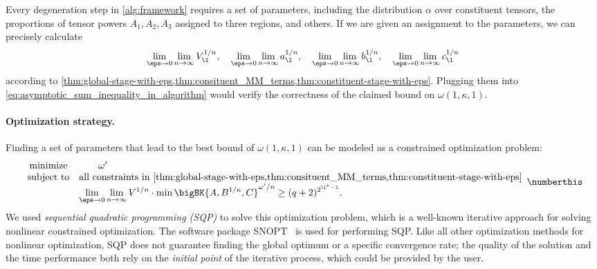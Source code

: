 \bigskip

Every degeneration step in \cref{alg:framework} requires a set of parameters, including the distribution $\alpha$ over constituent tensors, the proportions of tensor powers $A_1, A_2, A_3$ assigned to three regions, and others. If we are given an assignment to the parameters, we can precisely calculate
\[
  \lim_{\eps \to 0} \lim_{n \to \infty} \numgrowl^{1/n}, \quad \lim_{\eps \to 0} \lim_{n \to \infty} a_\l^{1/n}, \quad \lim_{\eps \to 0} \lim_{n \to \infty} b_\l^{1/n}, \quad \lim_{\eps \to 0} \lim_{n \to \infty} c_\l^{1/n}
\]
according to \cref{thm:global-stage-with-eps,thm:consituent_MM_terms,thm:constituent-stage-with-eps}. Plugging them into \eqref{eq:asymptotic_sum_inequality_in_algorithm} would verify the correctness of the claimed bound on $\omega(1, \kappa, 1)$.

\paragraph{Optimization strategy.}

Finding a set of parameters that lead to the best bound of $\omega(1, \kappa, 1)$ can be modeled as a constrained optimization problem:
\[
  \begin{array}{cl}
    \textup{minimize} & \qquad \omega' \\
    \textup{subject to} & \textup{all constraints in \cref{thm:global-stage-with-eps,thm:consituent_MM_terms,thm:constituent-stage-with-eps}} \\
                      & \displaystyle \lim_{\eps \to 0} \lim_{n \to \infty} \numgrow^{1/n} \cdot \min\bigBK{A, B^{1/\kappa}, C}^{\omega'/n} \ge (q + 2)^{2^{\l^* - 1}}.
  \end{array}
  \numberthis \label{eq:optimization_problem}
\]
We used \emph{sequential quadratic programming (SQP)} to solve this optimization problem, which is a well-known iterative approach for solving nonlinear constrained optimization. The software package SNOPT~\cite{SNOPT} is used for performing SQP. Like all other optimization methods for nonlinear optimization, SQP does not guarantee finding the global optimum or a specific convergence rate; the quality of the solution and the time performance both rely on the \emph{initial point} of the iterative process, which could be provided by the user.

